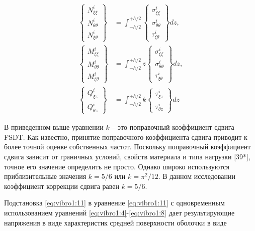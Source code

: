 \begin{equation}
	\label{eq:vibro1:11}
	\begin{split}
	\begin{Bmatrix}
		N_{\xi \xi}^{i} \\
		N_{\theta \theta}^{i} \\
		N_{\xi \theta}^{i} 
	\end{Bmatrix} &=
	\int_{-h/2}^{+h/2}
	\begin{Bmatrix}
		\sigma_{\xi \xi}^{i} \\
		\sigma_{\theta \theta}^{i} \\
		\tau_{\xi \theta}^{i} 
	\end{Bmatrix}
	dz,\\
	\begin{Bmatrix}
	M_{\xi \xi}^{i} \\
	M_{\theta \theta}^{i} \\
	M_{\xi \theta}^{i} 
\end{Bmatrix} &=
\int_{-h/2}^{+h/2} z
\begin{Bmatrix}
	\sigma_{\xi \xi}^{i} \\
	\sigma_{\theta \theta}^{i} \\
	\tau_{\xi \theta}^{i} 
\end{Bmatrix}
dz,\\
	\begin{Bmatrix}
	Q_{\xi z}^{i} \\
	Q_{\theta z}^{i}
\end{Bmatrix} &=
\int_{-h/2}^{+h/2} k
\begin{Bmatrix}
	\tau_{\xi z}^{i} \\
	\tau_{\theta z}^{i}
\end{Bmatrix}
dz
\end{split}
\end{equation}

В приведенном выше уравнении \(k\) -- это поправочный коэффициент сдвига FSDT. Как известно, принятие поправочного коэффициента сдвига приводит к более точной оценке собственных частот. Поскольку поправочный коэффициент сдвига зависит от граничных условий, свойств материала и типа нагрузки [39*], точное его значение определить не просто. Однако широко используются приблизительные значения \(k = 5/6 \) или \(k = \pi^2 / 12\). В данном исследовании коэффициент коррекции сдвига равен \(k = 5/6 \).


Подстановка \cref{eq:vibro1:11} в уравнение \cref{eq:vibro1:11} с одновременным использованием уравнений \cref{eq:vibro1:4}-\cref{eq:vibro1:8} дает результирующие напряжения в виде характеристик средней поверхности оболочки в виде

